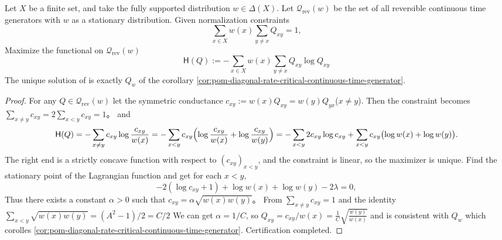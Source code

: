 \begin{theorem}\label{thm:pom-diagonal-rate-critical-continuous-time-generator-maxent}
Let \(X\) be a finite set, and take the fully supported distribution \(w\in\Delta(X)\).
Let \(\mathcal Q_{\mathrm{rev}}(w)\) be the set of all reversible continuous time generators with \(w\) as a stationary distribution.
Given normalization constraints
\[
\sum_{x\in X}w(x)\sum_{y\ne x}Q_{xy}=1,
\]
Maximize the functional on \(\mathcal Q_{\mathrm{rev}}(w)\)
\[
\mathsf H(Q):=-\sum_{x\in X}w(x)\sum_{y\ne x}Q_{xy}\log Q_{xy}
\]
The unique solution of is exactly \(Q_w\) of the corollary \ref{cor:pom-diagonal-rate-critical-continuous-time-generator}.
\end{theorem}
\begin{proof}
For any \(Q\in\mathcal Q_{\mathrm{rev}}(w)\) let the symmetric conductance \(c_{xy}:=w(x)Q_{xy}=w(y)Q_{yx}\)(\(x\ne y\)).
Then the constraint becomes
\(
\sum_{x\ne y}c_{xy}=2\sum_{x<y}c_{xy}=1
\)。
and
\[
\mathsf H(Q)
=-\sum_{x\ne y}c_{xy}\log\frac{c_{xy}}{w(x)}
=-\sum_{x<y}c_{xy}\Bigl(\log\frac{c_{xy}}{w(x)}+\log\frac{c_{xy}}{w(y)}\Bigr)
=-\sum_{x<y}2c_{xy}\log c_{xy}+\sum_{x<y}c_{xy}\bigl(\log w(x)+\log w(y)\bigr).
\]
The right end is a strictly concave function with respect to \((c_{xy})_{x<y}\), and the constraint is linear, so the maximizer is unique.
Find the stationary point of the Lagrangian function and get for each \(x<y\),
\[
-2(\log c_{xy}+1)+\log w(x)+\log w(y)-2\lambda=0,
\]
Thus there exists a constant \(\alpha>0\) such that
\(
c_{xy}=\alpha\sqrt{w(x)w(y)}
\)。
From \(\sum_{x\ne y}c_{xy}=1\) and the identity
\(
\sum_{x<y}\sqrt{w(x)w(y)}=(A^2-1)/2=C/2
\)
We can get \(\alpha=1/C\), so
\(
Q_{xy}=c_{xy}/w(x)=\frac{1}{C}\sqrt{\frac{w(y)}{w(x)}}
\)
and is consistent with \(Q_w\) which corolles \ref{cor:pom-diagonal-rate-critical-continuous-time-generator}. Certification completed.
\end{proof}

